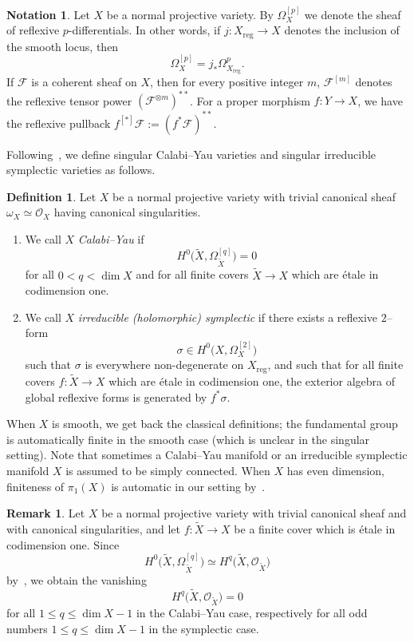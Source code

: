 \documentclass[11pt]{article}
\theoremstyle{definition}
\newtheorem{defi}[theo]{Definition}
\newtheorem{rema}[theo]{Remark}
\newtheorem{nota}[theo]{Notation}
\numberwithin{equation}{section}
\numberwithin{figure}{section}
\numberwithin{table}{section}
\DeclareMathOperator{\reg}{reg}
\newcommand\sF{\mathcal{F}}
\newcommand\sO{\mathcal{O}}
\newcommand{\OO}{\mathcal{O}}
\newcommand*{\alphenumi}{\renewcommand*{\theenumi}{\alph{enumi}}}
\begin{document}
\begin{nota}\label{nota:main2.1}
Let $X$ be a normal projective variety. By $\Omega^{[p]}_X$ we denote the sheaf of reflexive $p$-differentials. In other words, if $j\colon X_{\reg} \to X$ denotes the inclusion of the smooth locus, then
\[
\Omega^{[p]}_X = j_*\Omega^p_{X_{\reg}}.
\]
If $\sF$ is a coherent sheaf on $X$, then for every positive integer $m$, $\sF^{[m]}$ denotes the reflexive tensor power $(\sF^{\otimes m})^{**}$. For a proper morphism $f\colon Y\to X$, we have the reflexive pullback $f^{[*]}\sF:=(f^*\sF)^{**}$.
\end{nota}

Following~\cite{GKP16}, we define singular Calabi--Yau varieties and singular irreducible symplectic varieties as follows.

\begin{defi}\label{def:CYSympl}
Let $X$ be a normal projective variety with trivial canonical sheaf $\omega_X \simeq \sO_X$ having canonical singularities.
\begin{enumerate}\alphenumi
\item \label{list-2.2.1}We call $X$ \emph{Calabi--Yau} if
\[
H^0 \big(\widetilde X, \Omega_{\widetilde X}^{[q]} \big) = 0
\]
for all $0 < q < \dim X$ and for all finite covers $\widetilde X \to X$ which are étale in codimension one.
\item \label{list-2.2.2}We call $X$ \emph{irreducible (holomorphic) symplectic} if there exists a reflexive $2$--form
\[
\sigma \in H^0\big(X, \Omega_{X}^{[2]} \big)
\]
such that $\sigma$ is everywhere non-degenerate on $X_{\reg}$, and such that for all finite covers $f\colon \widetilde X \to X$ which are étale in codimension one, the exterior algebra of global reflexive forms is generated by $f^*\sigma$.
\end{enumerate}
\end{defi}

When $X$ is smooth, we get back the classical definitions; the fundamental group is automatically finite in the smooth case (which is unclear in the singular setting). Note that sometimes a Calabi--Yau manifold or an irreducible symplectic manifold $X$ is assumed to be simply connected. When $X$ has even dimension, finiteness of $\pi_1(X)$ is automatic in our setting by~\cite[Proposition~8.23]{GKP16}.

\begin{rema}\label{rem4}
Let $X$ be a normal projective variety with trivial canonical sheaf and with canonical singularities, and let $f\colon \widetilde X \to X$ be a finite cover which is étale in codimension one. Since
\[
H^0\big(\widetilde X,\Omega^{[q]}_{\widetilde X}\big) \simeq H^q\big(\widetilde X,\OO_{\widetilde X}\big)
\]
by~\cite[Proposition~6.9]{GKP16}, we obtain the vanishing
\[
H^q\big(\widetilde X,\OO_{\widetilde X}\big) = 0
\]
for all $1 \leq q \leq \dim X-1$ in the Calabi--Yau case, respectively for all odd numbers $1 \leq q \leq \dim X-1$ in the symplectic case.
\end{rema}
\end{document}
